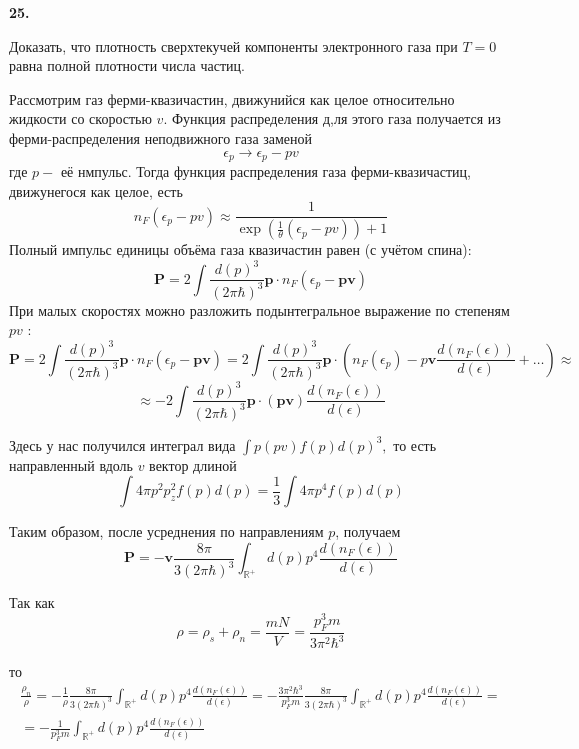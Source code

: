 \documentclass[a4paper,12pt]{article} %
\begin{document}
\begin{ttask} \textbf{25.} 

Доказать, что плотность сверхтекучей компоненты электронного газа 
при $T = 0$ равна полной плотности числа частиц.  








Рассмотрим газ ферми-квазичастин, движунийся как целое относительно жидкости со скоростью $v .$ Функция распределения д,ля этого газа получается из ферми-распределения неподвижного газа заменой
$$
\epsilon_{p} \rightarrow \epsilon_{p}-p v
$$
где $p-$ её нмпульс. Тогда функция распределения газа ферми-квазичастиц, движунегося как целое, есть
$$
n_{F}\left(\epsilon_{p}-p v\right) \approx \frac{1}{\exp \left(\frac{1}{\theta}\left(\epsilon_{p}-p v\right)\right)+1}
$$
Полный импульс единицы объёма газа квазичастин равен (с учётом спина):
$$
\boldsymbol{P}=2 \int \frac{d(p)^{3}}{(2 \pi \hbar)^{3}} \boldsymbol{p} \cdot n_{F}\left(\epsilon_{p}-\boldsymbol{p} \boldsymbol{v}\right)
$$
При малых скоростях можно разложить подынтегральное выражение по степеням $p v$ :
$$
\boldsymbol{P}
=
2 \int \frac{d(p)^{3}}{(2 \pi \hbar)^{3}} \boldsymbol{p} \cdot n_{F}\left(\epsilon_{p}-\boldsymbol{p} \boldsymbol{v}\right)
=
2 \int \frac{d(p)^{3}}{(2 \pi \hbar)^{3}} \boldsymbol{p} \cdot\left(n_{F}\left(\epsilon_{p}\right)-p \boldsymbol{v} \frac{d\left(n_{F}(\epsilon)\right)}{d(\epsilon)}+\ldots\right) 
\approx
$$
\[ 
\approx
-2 \int 
\frac{d(p)^{3}}{(2 \pi \hbar)^{3}} 
\boldsymbol{p} \cdot(\boldsymbol{p} \boldsymbol{v}) 
\frac{d\left(n_{F}(\epsilon)\right)}{d(\epsilon)}
 \]

Здесь у нас получился интеграл вида $\int p(p v) f(p) d(p)^{3},$ то есть направленный вдоль $v$ вектор длиной
$$
\int 4 \pi p^{2} p_{z}^{2} f(p) d(p)=\frac{1}{3} \int 4 \pi p^{4} f(p) d(p)
$$




Таким образом, после усреднения по направлениям $p$, получаем
$$
\boldsymbol{P}=-\boldsymbol{v} \frac{8 \pi}{3(2 \pi \hbar)^{3}} \int_{\mathbb{R}^{+}} d(p) p^{4} \frac{d\left(n_{F}(\epsilon)\right)}{d(\epsilon)}
$$



Так как
$$
\rho=\rho_{s}+\rho_{n}=\frac{m N}{V}=\frac{p_{F}^{3} m}{3 \pi^{2} \hbar^{3}}
$$


то
$$
\begin{array}{c}
	\frac{\rho_{n}}{\rho}=-\frac{1}{\rho} \frac{8 \pi}{3(2 \pi \hbar)^{3}} \int_{\mathbb{R}^{+}} d(p) p^{4} \frac{d\left(n_{F}(\epsilon)\right)}{d(\epsilon)}=-\frac{3 \pi^{2} \hbar^{3}}{p_{F}^{3} m} \frac{8 \pi}{3(2 \pi \hbar)^{3}} \int_{\mathbb{R}^{+}} d(p) p^{4} \frac{d\left(n_{F}(\epsilon)\right)}{d(\epsilon)}= \\
	=-\frac{1}{p_{F}^{3} m} \int_{\mathbb{R}^{+}} d(p) p^{4} \frac{d\left(n_{F}(\epsilon)\right)}{d(\epsilon)}
\end{array}
$$






\end{ttask}
\end{document}
